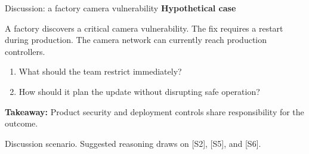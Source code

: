 \documentclass[aspectratio=169,12pt]{beamer}
\newcommand{\source}[1]{\par\vfill{\fontsize{6.5}{7.5}\selectfont\color{Muted}#1\par}}
\newcommand{\gap}{\par\vspace{2mm}}
\begin{document}
\begin{frame}{Discussion: a factory camera vulnerability}
\textbf{Hypothetical case}
\gap
A factory discovers a critical camera vulnerability.
The fix requires a restart during production.
The camera network can currently reach production controllers.
\gap
\begin{enumerate}
\item What should the team restrict immediately?
\item How should it plan the update without disrupting safe operation?
\end{enumerate}
\gap
\textbf{Takeaway:} Product security and deployment controls
share responsibility for the outcome.
\source{Discussion scenario. Suggested reasoning draws on [S2], [S5], and [S6].}
\end{frame}
\end{document}
